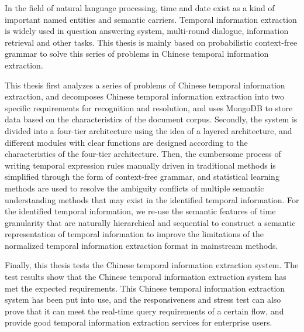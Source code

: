\begin{abstract*}
  In the field of natural language processing, time and date exist as a kind of important named entities and semantic carriers.
  Temporal information extraction is widely used in question answering system, multi-round dialogue, information retrieval and other tasks.
  This thesis is mainly based on probabilistic context-free grammar to solve this series of problems in Chinese temporal information extraction.

  This thesis first analyzes a series of problems of Chinese temporal information extraction, and decomposes Chinese temporal information extraction into two specific requirements for recognition and resolution, 
  and uses MongoDB to store data based on the characteristics of the document corpus.
  Secondly, the system is divided into a four-tier architecture using the idea of ​​a layered architecture, and different modules with clear functions are designed according to the characteristics of the four-tier architecture.
  Then, the cumbersome process of writing temporal expression rules manually driven in traditional methods is simplified through the form of context-free grammar, 
  and statistical learning methods are used to resolve the ambiguity conflicts of multiple semantic understanding methods that may exist in the identified temporal information.
  For the identified temporal information, we re-use the semantic features of time granularity that are naturally hierarchical and sequential to construct 
  a semantic representation of temporal information to improve the limitations of the normalized temporal information extraction format in mainstream methods.

  Finally, this thesis tests the Chinese temporal information extraction system. 
  The test results show that the Chinese temporal information extraction system has met the expected requirements.
  This Chinese temporal information extraction system has been put into use, 
  and the responsiveness and stress test can also prove that it can meet the real-time query requirements of a certain flow, and provide good temporal information extraction services for enterprise users.


\end{abstract*}
